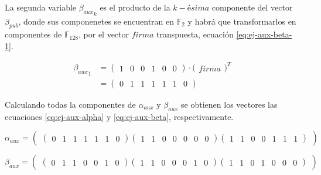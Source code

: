 La segunda variable ${\beta_{aux}}_k$ es el producto de la $k-ésima$ componente del vector $\beta_{pub}$, donde sus componenetes se encuentran en $\mathds{F}_2$ y habrá que transformarlos en componentes de $\mathds{F}_{128}$, por el vector $firma$ transpuesta, ecuación \ref{eq:ej-aux-beta-1}.

\begin{equation}\label{eq:ej-aux-beta-1}
	\begin{aligned}
	{{\beta_{aux}}_1} & = 
		\left(\begin{smallmatrix}1 & 0 & 0 & 1 & 0 & 0\end{smallmatrix}\right)
		\cdot \big(\begin{matrix}firma\end{matrix}\big)^{\scriptscriptstyle T}\\
		& = \left(\begin{smallmatrix}0 & 1 & 1 & 1 & 1 & 1 & 0\end{smallmatrix}\right)
	\end{aligned}
\end{equation}

Calculando todas la componentes de $\alpha_{aux}$ y $\beta_{aux}$ se obtienen los vectores las ecuaciones \ref{eq:ej-aux-alpha} y \ref{eq:ej-aux-beta}, respectivamente.

\begin{equation}\label{eq:ej-aux-alpha}
	{\alpha_{aux}} = \left(\begin{matrix}
		\left(\begin{smallmatrix}0 & 1 & 1 & 1 & 1 & 1 & 0\end{smallmatrix}\right)
		\left(\begin{smallmatrix}1 & 1 & 0 & 0 & 0 & 0 & 0\end{smallmatrix}\right)
		\left(\begin{smallmatrix}1 & 1 & 0 & 0 & 1 & 1 & 1\end{smallmatrix}\right)
		\end{matrix}\right)
\end{equation}

\begin{equation}\label{eq:ej-aux-beta}
	{\beta_{aux}} =
		\left(\begin{matrix}
			\left(\begin{smallmatrix}0 & 1 & 1 & 0 & 0 & 1 & 0\end{smallmatrix}\right)		
			\left(\begin{smallmatrix}1 & 1 & 0 & 0 & 0 & 1 & 0\end{smallmatrix}\right)
			\left(\begin{smallmatrix}1 & 1 & 0 & 1 & 0 & 0 & 0\end{smallmatrix}\right)
		\end{matrix}\right)
\end{equation}

